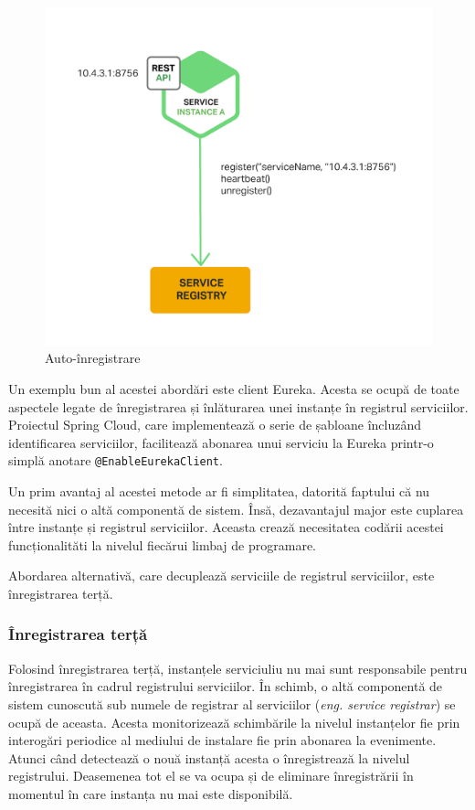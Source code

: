 \documentclass[12pt, a4paper, oneside, romanian]{teza-upb}
\begin{document}
\begin{figure}[ht]
\centering
\includegraphics[scale=0.22]{img/Richardson-microservices-part4-4_self-registration-pattern.png}
\caption{Auto-înregistrare}
\label{fig:arhi_componente}
\end{figure}

Un exemplu bun al acestei abordări este client Eureka. Acesta se ocupă de toate aspectele legate de înregistrarea și înlăturarea unei instanțe în registrul serviciilor. Proiectul Spring Cloud, care implementează o serie de șabloane încluzând identificarea serviciilor, facilitează abonarea unui serviciu la Eureka printr-o simplă anotare \texttt{@EnableEurekaClient}.

Un prim avantaj al acestei metode ar fi simplitatea, datorită faptului că nu necesită nici o altă componentă de sistem. Însă, dezavantajul major este cuplarea între instanțe și registrul serviciilor. Aceasta crează necesitatea codării acestei funcționalităti la nivelul fiecărui limbaj de programare.

Abordarea alternativă, care decuplează serviciile de registrul serviciilor, este înregistrarea terță.
\newpage
\subsubsection{Înregistrarea terță}
Folosind înregistrarea terță, instanțele serviciuliu nu mai sunt responsabile pentru înregistrarea în cadrul registrului serviciilor. În schimb, o altă componentă de sistem cunoscută sub numele de registrar al serviciilor (\textit{eng. service registrar}) se ocupă de aceasta. Acesta monitorizează schimbările la nivelul instanțelor fie prin interogări periodice al mediului de instalare fie prin abonarea la evenimente. Atunci când detectează o nouă instanță acesta o înregistrează la nivelul registrului. Deasemenea tot el se va ocupa și de eliminare înregistrării în momentul în care instanța nu mai este  disponibilă. 
\end{document}

